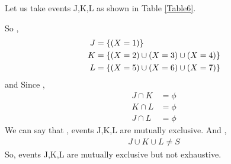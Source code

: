 \documentclass[journal,12pt,twocolumn]{IEEEtran}
\begin{document}
\begin{enumerate}[label=(\roman*)]
    Let us take events J,K,L as shown in Table \ref{Table6}.
    \begin{table}[ht!]
        
        \caption{}
        \label{Table6}
    \end{table}
    So ,
    \begin{align}
        J &= \left\{ (X=1) \right\} \\
        K &= \left\{ (X=2) \cup (X=3) \cup (X=4) \right\} \\
        L &= \left\{ (X=5) \cup (X=6) \cup (X=7) \right\}
    \end{align}
    and Since , 
    \begin{align}
        J \cap K &= \phi \\
        K \cap L &= \phi \\
        J \cap L &= \phi
    \end{align}
    We can say that , events J,K,L are mutually exclusive. And ,
    \begin{align}
        J \cup K \cup L \neq S 
    \end{align}  
    So, events J,K,L are mutually exclusive but not exhaustive.
    
\end{enumerate}
\end{document}
